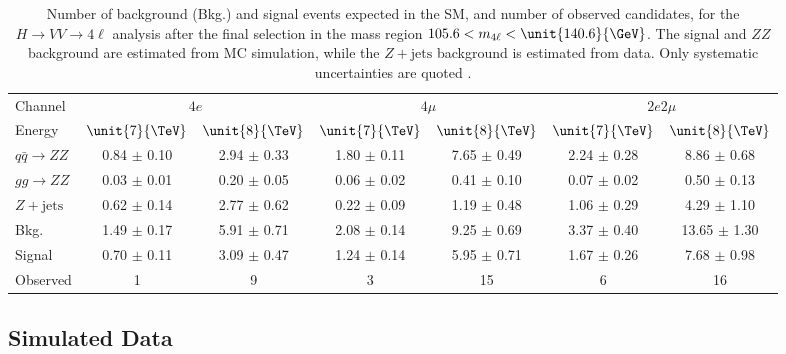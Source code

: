 \begin{table}
\centering
\caption[Number of background (Bkg.) and signal events expected in the SM, and number of
observed candidates, for the $H \to VV \to 4\ell$ analysis after the final selection in the
mass region $105.6 < m_{4\ell} < \unit{140.6}{\GeV}$. The signal and $ZZ$
background are estimated from MC simulation, while the $Z + \text{jets}$ background
is estimated from data. Only systematic uncertainties are quoted.]{
Number of background (Bkg.) and signal events expected in the SM, and number of
observed candidates, for the $H \to VV \to 4\ell$ analysis after the final selection in the
mass region $105.6 < m_{4\ell} < \unit{140.6}{\GeV}$. The signal and $ZZ$
background are estimated from MC simulation, while the $Z + \text{jets}$ background
is estimated from data. Only systematic uncertainties are quoted \cite{Khachatryan:2014kca}.
\label{tab:EventYieldsLowMass_spin}}
\begin{tabular}{lcccccc}
Channel & \multicolumn{2}{c}{$4e$} &  \multicolumn{2}{c}{$4\mu$} &  \multicolumn{2}{c}{$2e2\mu$} \\
Energy & $\unit{7}{\TeV}$ & $\unit{8}{\TeV}$ & $\unit{7}{\TeV}$ & $\unit{8}{\TeV}$ & $\unit{7}{\TeV}$ & $\unit{8}{\TeV}$  \\
\hline
$q\bar{q} \to ZZ$ &  0.84  $\pm$  0.10  &  2.94 $\pm$  0.33  &  1.80  $\pm$  0.11  & 7.65  $\pm$  0.49  &  2.24  $\pm$  0.28 & 8.86  $\pm$  0.68  \\
$gg \to ZZ$ &  0.03  $\pm$  0.01 &  0.20  $\pm$  0.05    &  0.06  $\pm$  0.02 &  0.41  $\pm$  0.10    &  0.07  $\pm$  0.02   &  0.50  $\pm$  0.13 \\
$Z + \text{jets}$ & 0.62 $\pm$ 0.14 & 2.77 $\pm$ 0.62 & 0.22 $\pm$ 0.09 & 1.19 $\pm$ 0.48 & 1.06 $\pm$ 0.29 & 4.29 $\pm$ 1.10\\
\hline
Bkg. & 1.49 $\pm$ 0.17 & 5.91 $\pm$ 0.71  & 2.08 $\pm$ 0.14  & 9.25 $\pm$ 0.69 &  3.37 $\pm$ 0.40 & 13.65 $\pm$ 1.30 \\
Signal &  0.70  $\pm$  0.11  &  3.09 $\pm$  0.47  &  1.24  $\pm$  0.14 &  5.95  $\pm$  0.71  & 1.67  $\pm$  0.26  &  7.68  $\pm$  0.98 \\
Observed  & 1 & 9 & 3 & 15 & 6 & 16 \\
\end{tabular}

\end{table}



\subsection{Simulated Data}
\label{sec:spin_MC}

